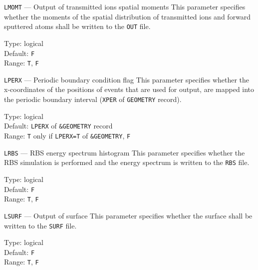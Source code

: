 \begin{keydescription}{\texttt{LMOMT} --- Output of transmitted ions spatial moments}
%
  This parameter specifies whether the moments of the spatial distribution 
  of transmitted ions and forward sputtered atoms shall be written to the \texttt{OUT} file.
  \begin{keytab}
    Type:    \> logical \\
    Default: \> \texttt{F} \\
    Range:   \> \texttt{T}, \texttt{F} 
  \end{keytab}
\end{keydescription}

\begin{keydescription}{\texttt{LPERX} --- Periodic boundary condition flag}
%
  This parameter specifies whether the x-coordinates of the positions of events that are used 
  for output, are mapped into the periodic boundary interval (\texttt{XPER} of 
  \texttt{GEOMETRY} record).
  \begin{keytab}
    Type:    \> logical \\
    Default: \> \texttt{LPERX} of \texttt{\&GEOMETRY} record \\
    Range:   \> \texttt{T} only if \texttt{LPERX=T} of \texttt{\&GEOMETRY}, \texttt{F} 
  \end{keytab}
\end{keydescription}

\begin{keydescription}{\texttt{LRBS} --- RBS energy spectrum histogram}
%
  This parameter specifies whether the RBS simulation is performed and the energy spectrum is 
  written to the \texttt{RBS} file.
  \begin{keytab}
    Type:    \> logical \\
    Default: \> \texttt{F} \\
    Range:   \> \texttt{T}, \texttt{F} 
  \end{keytab}
\end{keydescription}

\ifprivate
\begin{keydescription}{\texttt{LSURF} --- Output of surface}
%
  This parameter specifies whether the surface shall be written to the \texttt{SURF} file.
 \begin{keytab}
    Type:    \> logical \\
    Default: \> \texttt{F} \\
    Range:   \> \texttt{T}, \texttt{F} 
  \end{keytab}
\end{keydescription}
\fi

